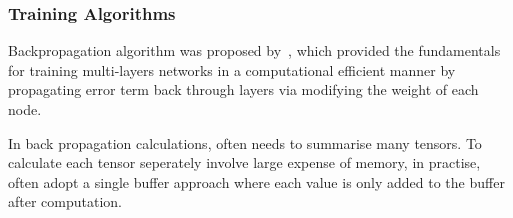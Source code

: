\subsubsection{Training Algorithms}
Backpropagation algorithm was proposed by~\citet{werbos1975beyond}, which provided the fundamentals for training multi-layers networks in a computational efficient manner by propagating error term back through layers via modifying the weight of each node. 
\par
In back propagation calculations, often needs to summarise many tensors. To calculate each tensor seperately involve large expense of memory, in practise, often adopt a single buffer approach where each value is only added to the buffer after computation. 